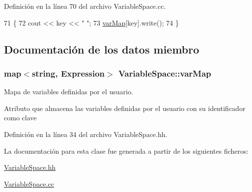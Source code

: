Definición en la línea 70 del archivo Variable\+Space.\+cc.


\begin{DoxyCode}
71 \{
72   cout << key << \textcolor{stringliteral}{" "};
73   \hyperlink{class_variable_space_a5af4ff4cfb476da8de2ffd88e511dd01}{varMap}[key].write();
74 \}
\end{DoxyCode}


\subsection{Documentación de los datos miembro}
\subsubsection[{\texorpdfstring{var\+Map}{varMap}}]{\setlength{\rightskip}{0pt plus 5cm}map$<$string, {\bf Expression}$>$ Variable\+Space\+::var\+Map\hspace{0.3cm}{\ttfamily [private]}}\hypertarget{class_variable_space_a5af4ff4cfb476da8de2ffd88e511dd01}{}\label{class_variable_space_a5af4ff4cfb476da8de2ffd88e511dd01}


Mapa de variables definidas por el usuario. 

Atributo que almacena las variables definidas por el usuario con su identificador como clave 

Definición en la línea 34 del archivo Variable\+Space.\+hh.



La documentación para esta clase fue generada a partir de los siguientes ficheros\+:\begin{DoxyCompactItemize}
\item 
\hyperlink{_variable_space_8hh}{Variable\+Space.\+hh}\item 
\hyperlink{_variable_space_8cc}{Variable\+Space.\+cc}\end{DoxyCompactItemize}
